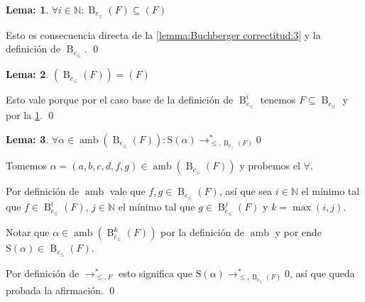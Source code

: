 \documentclass{report}
\theoremstyle{customstyle}
\newtheorem{lemma}{Lema:}[chapter]
\renewenvironment{proof}[1][\proofname]{{\bfseries #1: }}{\qed} %
\theoremstyle{factstyle}
\DeclareMathOperator{\amb}{amb}
\renewcommand{\S}{\text{S}}
\DeclareMathOperator{\B}{B}
\begin{document}
\begin{lemma}\label{lemma:Buchberger correctitud:4}
  $∀i ∈ ℕ : \B_{e_≤}(F) ⊆ (F)$
\end{lemma}
\begin{proof}
  Esto es consecuencia directa de la \cref{lemma:Buchberger correctitud:3} y la definición de $\B_{e_≤}$.
\end{proof}

\begin{lemma}\label{lemma:Buchberger correctitud:5}
  $(\B_{e_≤}(F)) = (F)$
\end{lemma}
\begin{proof}
  Esto vale porque por el caso base de la definición de $\B_{e_≤}^i$ tenemos $F ⊆ \B_{e_≤}$ y por la \cref{lemma:Buchberger correctitud:4}.
\end{proof}

\begin{lemma}\label{lemma:Buchberger correctitud:6}
  $∀α ∈ \amb(\B_{e_≤}(F)) : \S(α) →^*_{≤, \B_{e_≤}(F)} 0$
\end{lemma}
\begin{proof}
  Tomemos $α = (a, b, c, d, f, g) ∈ \amb(\B_{e_≤}(F))$ y probemos el $∀$.

  Por definición de $\amb$ vale que $f, g ∈ \B_{e_≤}(F)$, así que sea $i ∈ ℕ$ el mínimo tal que $f ∈ \B_{e_≤}^i(F)$, $j ∈ ℕ$ el mínimo tal que $g ∈ \B_{e_≤}^j(F)$ y $k = \max(i, j)$.

  Notar que $α ∈ \amb(\B_{e_≤}^k(F))$ por la definición de $\amb$ y por ende $\S(α) ∈ \B_{e_≤}(F)$.

  Por definición de $→^*_{≤, F}$ esto significa que $\S(α) →^*_{≤, \B_{e_≤}(F)} 0$, así que queda probada la afirmación.
\end{proof}
\end{document}
